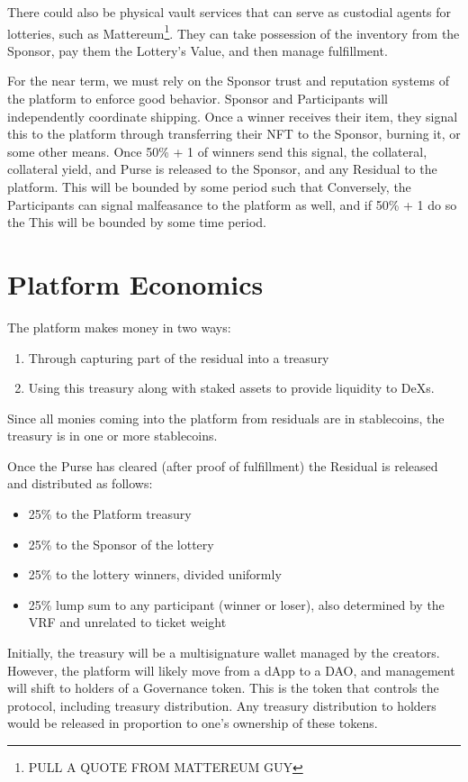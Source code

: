 \documentclass[runningheads]{llncs}
\begin{document}
There could also be physical vault services that can serve as custodial agents for lotteries, such as Mattereum\footnote{PULL A QUOTE FROM MATTEREUM GUY}.  They can take possession of the inventory from the Sponsor, pay them the Lottery’s Value, and then manage fulfillment.

For the near term, we must rely on the Sponsor trust and reputation systems of the platform to enforce good behavior.  Sponsor and Participants will independently coordinate shipping.  Once a winner receives their item, they signal this to the platform through transferring their NFT to the Sponsor, burning it, or some other means.  Once 50\% + 1 of winners send this signal, the collateral, collateral yield, and Purse is released to the Sponsor, and any Residual to the platform.  This will be bounded by some period such that Conversely, the Participants can signal malfeasance to the platform as well, and if 50\% + 1 do so the This will be bounded by some time period.


\section{Platform Economics}\label{section-PlatformEconomics}

The platform makes money in two ways:
\begin{enumerate}
\item Through capturing part of the residual into a treasury
\item Using this treasury along with staked assets to provide liquidity to DeXs.  
\end{enumerate}

Since all monies coming into the platform from residuals are in stablecoins, the treasury is in one or more stablecoins.

Once the Purse has cleared (after proof of fulfillment) the Residual is released and distributed as follows:
\begin{itemize}
\item 25\% to the Platform treasury
\item 25\% to the Sponsor of the lottery
\item 25\% to the lottery winners, divided uniformly
\item 25\% lump sum to any participant (winner or loser), also determined by the VRF and unrelated to ticket weight
\end{itemize}

Initially, the treasury will be a multisignature wallet managed by the creators.  However, the platform will likely move from a dApp to a DAO, and management will shift to holders of a Governance token.  This is the token that controls the protocol, including treasury distribution.  Any treasury distribution to holders would be released in proportion to one’s ownership of these tokens. 
\end{document}

